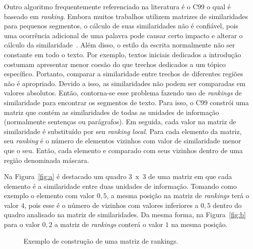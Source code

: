 Outro algoritmo frequentemente referenciado na literatura é o C99 o qual é baseado em \textit{ranking}. Embora muitos trabalhos utilizem matrizes de similaridades para pequenos segmentos, o cálculo de suas similaridades não é confiável, pois uma ocorrência adicional de uma palavra pode causar certo impacto e alterar o cálculo da similaridade~\cite{Choi2000}. Além disso, o estilo da escrita normalmente não ser constante em todo o texto. Por exemplo, textos iniciais dedicados a introdução costumam apresentar menor coesão do que trechos dedicados a um tópico específico. Portanto, comparar a similaridade entre trechos de diferentes regiões não é apropriado. Devido a isso, as similaridades não podem ser comparadas em valores absolutos. Então, contorna-se esse problema fazendo uso de \textit{rankings} de similaridade para encontrar os segmentos de texto. Para isso, o C99 constrói uma matriz que contém as similaridades de todas as unidades de informação (normalmente sentenças ou parágrafos). Em seguida, cada valor na matriz de similaridade é substituído por seu \textit{ranking local}. Para cada elemento da matriz, seu \textit{ranking} é o número de elementos vizinhos com valor de similaridade menor que o seu. Então, cada elemento e comparado com seus vizinhos dentro de uma região denominada máscara.

Na Figura~\ref{fig:a} é destacado um quadro 3~x~3 de uma matriz em que cada elemento é a similaridade entre duas unidades de informação. Tomando como exemplo o elemento com valor $0,5$, a mesma posição na matriz de \textit{rankings} terá o valor $4$, pois esse é o número de vizinhos com valores inferiores a $0,5$ dentro do quadro analisado na matriz de similaridades. Da mesma forma, na Figura~\ref{fig:b} para o valor $0,2$ a matriz de \textit{rankings} conterá o valor $1$ na mesma posição.

\begin{figure}[!h]
	\centering     %

	
	\caption{Exemplo de construção de uma matriz de rankings.%
	}
	\label{fig:exemplomatrixrank}
\end{figure}



